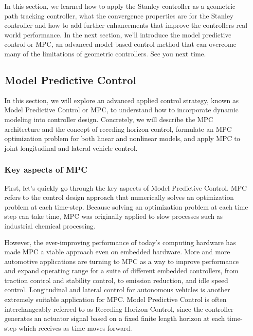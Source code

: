 In this section, we learned how to apply the Stanley controller as a geometric path tracking controller, what the convergence properties are for the Stanley controller and how to add further enhancements that improve the controllers real-world performance. In the next section, we'll introduce the model predictive control or MPC, an advanced model-based control method that can overcome many of the limitations of geometric controllers. See you next time.


\subsection{Model Predictive Control}
\label{model_predictive_control}
In this section, we will explore an advanced applied control strategy, known as Model Predictive Control or MPC, to understand how to incorporate dynamic modeling into
controller design. Concretely, we will describe the MPC architecture and the concept of
receding horizon control, formulate an MPC optimization problem for both linear and nonlinear models, and apply MPC to joint longitudinal
and lateral vehicle control. 

\subsubsection{Key aspects of MPC}
\label{key_aspects_mpc}

 First, let's quickly go through the key aspects
of Model Predictive Control. MPC refers to the control
design approach that numerically solves an optimization
problem at each time-step. Because solving an
optimization problem at each time step can take time, MPC was originally applied to slow processes such as
industrial chemical processing. 

However, the ever-improving performance of today's computing hardware has made MPC a viable approach even
on embedded hardware. More and more automotive applications are turning to MPC as a way to improve performance and expand
operating range for a suite of different embedded controllers, from traction control
and stability control, to emission reduction, and idle speed control. Longitudinal and lateral control
for autonomous vehicles is another extremely suitable
application for MPC. Model Predictive Control is often interchangeably referred to
as Receding Horizon Control, since the controller generates
an actuator signal based on a fixed finite length horizon at each time-step which receives
as time moves forward. 

